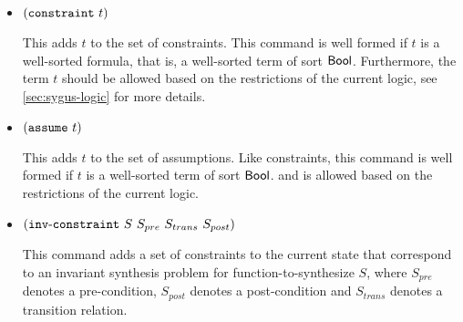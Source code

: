 \documentclass[english,a4paper,10pt]{article}
\begin{document}
\begin{itemize}
\item ${\tt (}{\tt constraint}\mbox{ }t{\tt )}$

This adds $t$ to the set of constraints.
This command is well formed if $t$ is a well-sorted formula,
that is, a well-sorted term of sort $\mathsf{Bool}$.
Furthermore,
the term $t$ should be allowed
based on the restrictions of the current logic,
see \cref{sec:sygus-logic} for more details.

\item ${\tt (}{\tt assume}\mbox{ }t{\tt )}$

This adds $t$ to the set of assumptions.
Like constraints,
this command is well formed if $t$ is a well-sorted term of sort $\mathsf{Bool}$.
and is allowed based on the restrictions of the current logic.

\item ${\tt (}{\tt inv\mbox{-}constraint}\mbox{ }S\mbox{ }S_{pre}\mbox{ }S_{trans}\mbox{ }S_{post}{\tt )}$

This command adds a set of constraints to the current 
state that correspond to an invariant synthesis problem for function-to-synthesize $S$,
where $S_{pre}$ denotes a pre-condition,
$S_{post}$ denotes a post-condition
and $S_{trans}$ denotes a transition relation.


\end{itemize}
\end{document}
